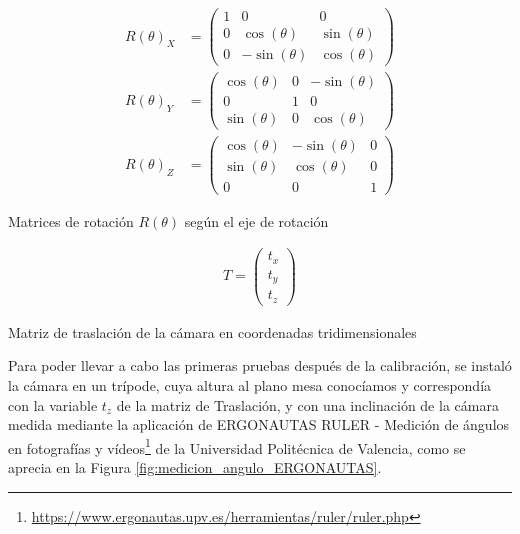     \begin{myequation}[H]
      \begin{align*}
        R(\theta)_X &= 
        \begin{pmatrix}
        1 & 0 & 0 \\
        0 & \cos(\theta) & \sin(\theta) \\
        0 & -\sin(\theta) & \cos(\theta)
        \end{pmatrix} \\[2ex]
        \nonumber
        R(\theta)_Y &= 
        \begin{pmatrix}
        \cos(\theta) & 0 & -\sin(\theta) \\
        0 & 1 & 0 \\
        \sin(\theta) & 0 & \cos(\theta)
        \end{pmatrix} \\[2ex]
        \nonumber
        R(\theta)_Z &= 
        \begin{pmatrix}
        \cos(\theta) & -\sin(\theta) & 0 \\
        \sin(\theta) & \cos(\theta) & 0 \\
        0 & 0 & 1
        \nonumber
      \end{pmatrix}
    \end{align*}
    \caption{Matrices de rotación \( R(\theta) \) según el eje de rotación}
    \label{ec:rotacion_ejes}
    \end{myequation}


  \begin{myequation}[H]
    \begin{align}
      T =
      \begin{pmatrix}
        t_x \\
        t_y \\
        t_z
      \end{pmatrix}
    \nonumber
    \end{align}
    \caption{Matriz de traslación de la cámara en coordenadas tridimensionales}
    \label{ec:matriz_traslacion}
  \end{myequation}

Para poder llevar a cabo las primeras pruebas después de la calibración, se instaló la cámara en un trípode, cuya altura al plano mesa conocíamos y correspondía con la variable $t_z$ de la matriz de Traslación, y con una inclinación de la cámara medida mediante la aplicación de ERGONAUTAS RULER - Medición de ángulos en fotografías y vídeos\footnote{\url{https://www.ergonautas.upv.es/herramientas/ruler/ruler.php}} de la Universidad Politécnica de Valencia, como se aprecia en la Figura \ref{fig:medicion_angulo_ERGONAUTAS}.


